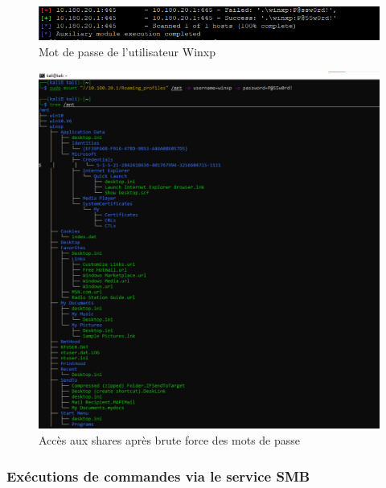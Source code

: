 \documentclass[french,paper=a4,oneside,captions=tableheading]{article}
\begin{document}
\begin{figure}[H]
    \centering
    \includegraphics[width=0.99\linewidth]{images/password_winxp.png}
    \caption{Mot de passe de l'utilisateur Winxp}
    \label{fig:winxppassword}
\end{figure}

\begin{figure}[H]
    \centering
    \includegraphics[width=0.99\linewidth]{images/smb-access.png}
    \caption{Accès aux shares après brute force des mots de passe}
    \label{fig:smbaccess}
\end{figure}



\subsubsection{Exécutions de commandes via le service SMB}
\end{document}
